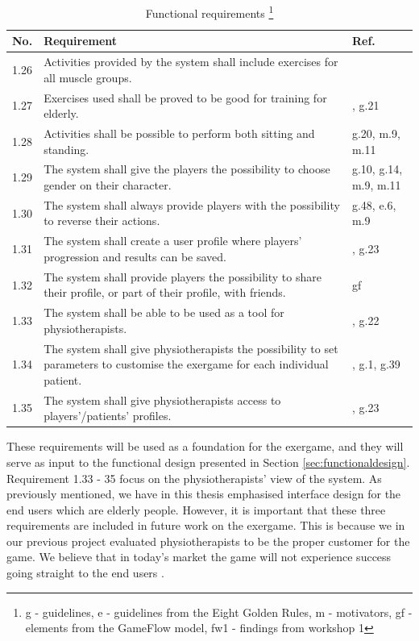 \begin{minipage}{12 cm}
\begin{table} [H]
\centering
\begin{tabular}{|>{\raggedright}p{}|p{}|p{}|}
\hline
\textbf{No.} & \textbf{Requirement} & \textbf{Ref.} \\ \hline
1.26 & Activities provided by the system shall include exercises for all muscle groups. & \cite{aktivitetsbok} \\ \hline
1.27 & Exercises used shall be proved to be good for training for elderly. & \cite{project}, g.21 \\ \hline
1.28 & Activities shall be possible to perform both sitting and standing. & g.20, m.9, m.11 \\ \hline
1.29 & The system shall give the players the possibility to choose gender on their character. &  g.10, g.14, m.9, m.11 \\ \hline
1.30 & The system shall always provide players with the possibility to reverse their actions. & g.48, e.6, m.9 \\ \hline
1.31 & The system shall create a user profile where players' progression and results can be saved. & \cite{project}, g.23 \\ \hline
1.32 & The system shall provide players the possibility to share their profile, or part of their profile, with friends. &  gf \\ \hline
1.33 & The system shall be able to be used as a tool for physiotherapists. & \cite{project}, g.22 \\ \hline
1.34 & The system shall give physiotherapists the possibility to set parameters to customise the exergame for each individual patient. & \cite{project}, g.1, g.39  \\ \hline
1.35 & The system shall give physiotherapists access to players'/patients' profiles. & \cite{project}, g.23\\ \hline  
\end{tabular}
\caption[Functional requirements, part 3]{Functional requirements \footnote{g - guidelines, e - guidelines from the Eight Golden Rules, m - motivators, gf - elements from the GameFlow model, fw1 - findings from workshop 1}}
\label{tab:func3}
\end{table} 
\end{minipage}

These requirements will be used as a foundation for the exergame, and they will serve as input to the functional design presented in Section \ref{sec:functionaldesign}. Requirement 1.33 - 35 focus on the physiotherapists' view of the system. As previously mentioned, we have in this thesis emphasised interface design for the end users which are elderly people. However, it is important that these three requirements are included in future work on the exergame. This is because we in our previous project \cite{project} evaluated physiotherapists to be the proper customer for the game. We believe that in today's market the game will not experience success going straight to the end users \cite{project}.  

